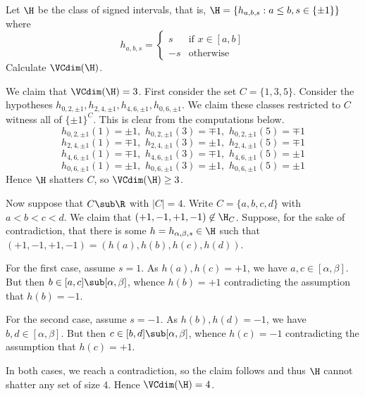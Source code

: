 \documentclass[12pt]{article}
\begin{document}
\begin{homeworkProblem}
  Let $ \H $ be the class of signed intervals, that is, $ \H = \{h_{a,b,s}:a\leq b, s\in \{\pm 1\}\} $ where
  \[
    h_{a,b,s} = 
    \begin{cases}
      s & \text{if }x\in[a,b] \\
      -s & \text{otherwise}
    \end{cases}
  \]
  Calculate $ \VCdim(\H) $.
\end{homeworkProblem}

\begin{solution}
  We claim that $ \VCdim(\H) = 3 $. First consider the set $ C = \{1,3,5\} $. Consider the hypotheses $ h_{0,2,\pm1}, h_{2,4,\pm1}, h_{4,6,\pm1},h_{0,6,\pm1}$. We claim these classes restricted to $ C $ witness all of $ \{\pm 1\}^{C} $. This is clear from the computations below.
  \[
    h_{0,2,\pm1}(1) = \pm1,\,\, h_{0,2,\pm1}(3)=\mp1,\,\, h_{0,2,\pm1}(5)=\mp1
  \]
  \[
    h_{2,4,\pm1}(1) = \mp1,\,\, h_{2,4,\pm1}(3)=\pm1,\,\, h_{2,4,\pm1}(5)=\mp1
  \]
  \[
    h_{4,6,\pm1}(1) = \mp1,\,\, h_{4,6,\pm1}(3)=\mp1,\,\, h_{4,6,\pm1}(5)=\pm1
  \]
  \[
    h_{0,6,\pm1}(1) = \pm1,\,\, h_{0,6,\pm1}(3)=\pm1,\,\, h_{0,6,\pm1}(5)=\pm1
  \]
  Hence $ \H $ shatters $ C $, so $ \VCdim(\H) \geq 3 $.

  Now suppose that $ C\sub \R $ with $ |C| = 4 $. Write $ C = \{a,b,c,d\} $ with $ a<b<c<d $. We claim that $ (+1,-1,+1,-1)\not\in\H_{C}  $. Suppose, for the sake of contradiction, that there is some $ h = h_{\alpha,\beta,s}\in \H $ such that $ (+1,-1,+1,-1) = (h(a), h(b), h(c), h(d)) $. 
  
  For the first case, assume $ s=1 $. As $ h(a),h(c) = +1 $, we have $ a,c\in [\alpha,\beta] $. But then $ b\in [a,c]\sub [\alpha,\beta] $, whence $ h(b) = +1 $ contradicting the assumption that $ h(b) = -1 $. 

  For the second case, assume $ s=-1 $. As $ h(b),h(d) = -1 $, we have $ b,d\in [\alpha,\beta] $. But then $ c\in[b,d]\sub [\alpha,\beta] $, whence $ h(c) = -1 $ contradicting the assumption that $ h(c) = +1 $.

  In both cases, we reach a contradiction, so the claim follows and thus $ \H $ cannot shatter any set of size $ 4 $. Hence $ \VCdim(\H) = 4 $.


\end{solution}
\end{document}
